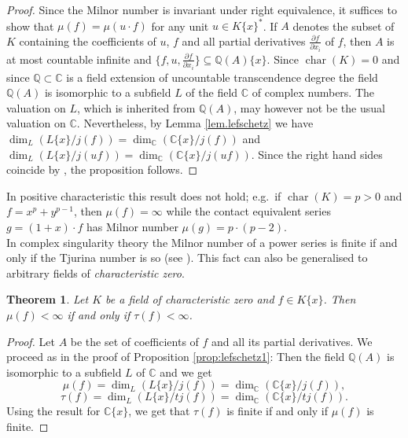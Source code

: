 \documentclass[11pt]{article}
\DeclareMathOperator{\Char}{char}
\newtheorem{Theorem}[Definition]{Theorem}
\newcommand{\C}{{\mathbb C}}
\newcommand{\Q}{{\mathbb Q}}
\begin{document}
   \begin{proof}
     Since the Milnor number is invariant under right equivalence, it
     suffices to show that $\mu(f)=\mu(u\cdot f)$ for any unit
     $u\in K\{x\}^*$. If $A$ denotes the subset of $K$
     containing the coefficients of $u$, $f$ and all partial
     derivatives $\frac{\partial f}{\partial x_i}$ of $f$, then $A$ is at most countable  infinite and $\{f, u, \frac{\partial f}{\partial x_i} \} \subseteq \Q(A)\{x\}$.
     Since $\Char(K)=0$ and since $\Q\subset\C$ is a field
     extension of uncountable transcendence degree 
     the field $\Q(A)$ is isomorphic to a subfield ${L}$
     of the field $\C$ of complex numbers. The valuation on $L$, which is inherited from $\Q(A)$,  may however not be the usual valuation on $\C$. 
 {Nevertheless, by  Lemma \ref{lem.lefschetz}  we have
$\dim_{L}({L}\{x\}/j(f))=\dim_\C(\C\{x\}/j(f))$ and
$\dim_{L}({L}\{x\}/j(uf))=\dim_\C(\C\{x\}/j(uf))$. Since the right hand sides coincide by  \cite{Gr75}, the proposition follows.}
 \end{proof}

  In positive characteristic this result does not hold;
   e.g.\ if $\Char(K)=p>0$ and $f=x^p+y^{p-1}$, then $\mu(f)=\infty$
   while the contact equivalent series $g=(1+x)\cdot f$ has Milnor
   number $\mu(g)=p\cdot (p-2)$.\\


In complex singularity theory  the Milnor number of a power series is finite if and only if the Tjurina
   number is so (see \cite[Lemma 1.2.3]{GLS25}). This fact can also be
   generalised to arbitrary fields of \emph{characteristic zero}.

   \begin{Theorem}\label{thm:lefschetz2}
     Let $ K$ be a field of characteristic zero
     and $f\in K\{x\}$.
     Then $\mu(f)<\infty$ if and only if $\tau(f)<\infty$.    
   \end{Theorem}
   \begin{proof}
     Let $A$ be the set of
     coefficients of $f$ and all its partial derivatives. We proceed as in the     proof of Proposition \ref{prop:lefschetz1}: Then the field $\Q(A)$ is     isomorphic to a subfield ${L}$ of $\C$
     and we get 
     \begin{displaymath}
       \mu(f)=\dim_{L}({L}\{x\}/j(f))=\dim_\C(\C\{x\}/j(f)),
     \end{displaymath}
     \begin{displaymath}
      \tau(f)=\dim_{L}(L\{x\}/tj(f)) =\dim_\C(\C\{x\}/tj(f)).
     \end{displaymath}
     Using the result for $\C\{x\}$,  we get that $\tau(f)$ is finite if and only if $\mu(f)$ is finite.     
 \end{proof}
\end{document}
